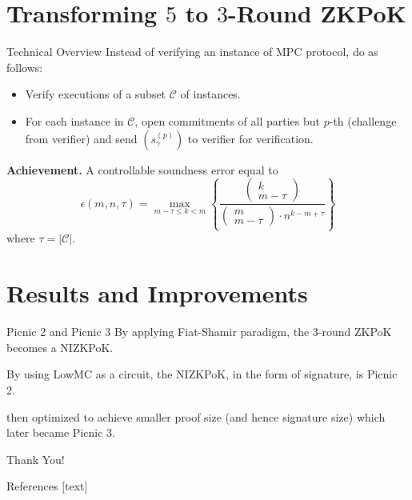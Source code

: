 \documentclass{beamer}
\begin{document}
	\section{Transforming $5$ to $3$-Round ZKPoK}
	\begin{frame}{Technical Overview}
		Instead of verifying an instance of MPC protocol, do as follows:\pause
		\begin{itemize}
			\item Verify executions of a subset $\mathcal{C}$ of instances.\pause
			\item For each instance in $\mathcal{C}$, open commitments of all parties but $p$-th (challenge from verifier) and send $(s_\gamma^{(p)})$ to verifier for verification.\pause
		\end{itemize}
		
		\textbf{Achievement.} A controllable soundness error equal to 
		\begin{equation*}
			\epsilon(m, n, \tau) = \max_{m - \tau \leq k < m}\left\{\frac{\begin{pmatrix}
					k\\m-\tau
			\end{pmatrix}}{\begin{pmatrix}
			m\\m-\tau
		\end{pmatrix}\cdot n^{k - m + \tau}}\right\}
		\end{equation*}
		where $\tau = \vert \mathcal{C}\vert$.
	\end{frame}

	\section{Results and Improvements}
	\begin{frame}{Picnic 2 and Picnic 3}
		By applying Fiat-Shamir paradigm, the $3$-round ZKPoK becomes a NIZKPoK.\pause
		
		By using LowMC as a circuit, the NIZKPoK, in the form of signature, is Picnic 2.\pause
		
		\cite{KalesZ20} then optimized to achieve smaller proof size (and hence signature size) which later became Picnic 3.
	\end{frame}
	
	\begin{frame}{}
		\begin{center}
			{\fontsize{20}{20}\selectfont Thank You!}
		\end{center}
	\end{frame}

	\begin{frame}[allowframebreaks]{References}
		
		
		
	\end{frame}
	
\end{document}
